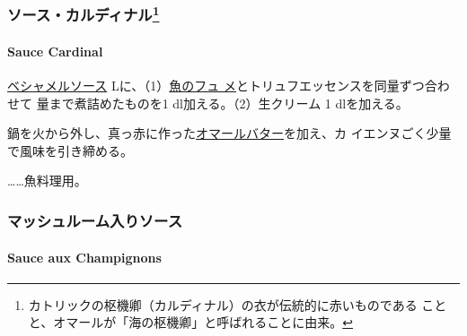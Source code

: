 \begin{recette}
{\subsubsection[ソース・カルディナル]{\texorpdfstring{ソース・カルディナル\footnote{カトリックの枢機卿（カルディナル）の衣が伝統的に赤いものである
  ことと、オマールが「海の枢機卿」と呼ばれることに由来。}}{ソース・カルディナル}}\label{ux30bdux30fcux30b9ux30abux30ebux30c7ux30a3ux30caux30eb21}}

\hypertarget{sauce-cardinal}{%
\paragraph{Sauce Cardinal}\label{sauce-cardinal}}


\protect\hyperlink{sauce-bechamel}{ベシャメルソース}\troisquarts{}
Lに、（1）\protect\hyperlink{fumet-de-poisson}{魚のフュ
メ}とトリュフエッセンスを同量ずつ合わせて
\troisquarts{}量まで煮詰めたものを1\undemi{} dl加える。（2）生クリーム
1\undemi{} dlを加える。

鍋を火から外し、真っ赤に作った\protect\hyperlink{beurre-de-homard}{オマールバター}を加え、カ
イエンヌごく少量で風味を引き締める。

\ldots{}\ldots{}魚料理用。

\maeaki

\hypertarget{ux30deux30c3ux30b7ux30e5ux30ebux30fcux30e0ux5165ux308aux30bdux30fcux30b9}{%
\subsubsection{マッシュルーム入りソース}\label{ux30deux30c3ux30b7ux30e5ux30ebux30fcux30e0ux5165ux308aux30bdux30fcux30b9}}

\hypertarget{sauce-aux-champignons-blanche}{%
\paragraph{Sauce aux Champignons}\label{sauce-aux-champignons-blanche}}



\end{recette}
